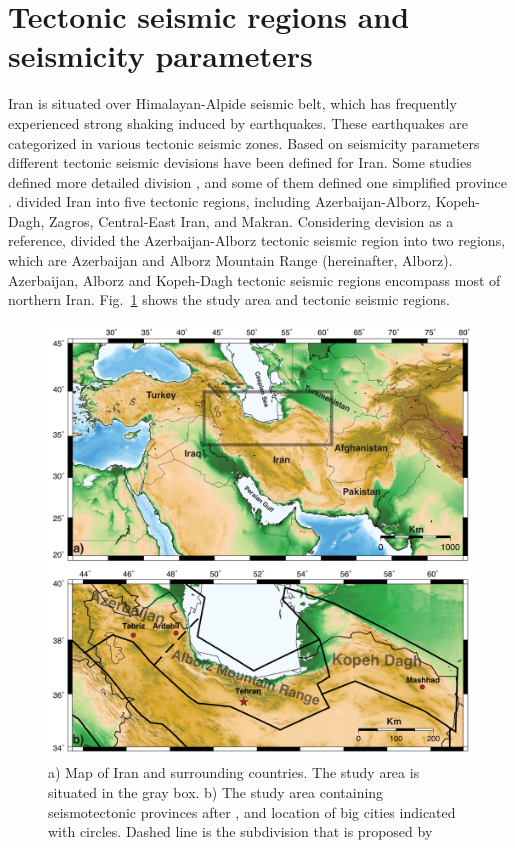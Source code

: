 
\section{Tectonic seismic regions and seismicity parameters}
\noindent
Iran is situated over Himalayan-Alpide seismic belt, which has frequently experienced strong shaking induced by earthquakes. These earthquakes are categorized in various tectonic seismic zones. Based on seismicity parameters different tectonic seismic devisions have been defined for Iran.  Some studies defined more detailed division \citep{Nowroozi1976, Tavakoli1999}, and some of them defined one simplified province \citep{Stocklin1968, Takin1972, Berberian1976}. \citet{Mirzaei1998} divided Iran into five tectonic regions, including Azerbaijan-Alborz, Kopeh-Dagh, Zagros, Central-East Iran, and Makran. Considering \citet{Mirzaei1998} devision as a reference, \citet{Karimiparidari2013} divided the Azerbaijan-Alborz tectonic seismic region into two regions, which are Azerbaijan and Alborz Mountain Range (hereinafter, Alborz). Azerbaijan, Alborz and Kopeh-Dagh tectonic seismic regions encompass most of northern Iran.  Fig.~\ref{fig:study_region} shows the study area and tectonic seismic regions. \\

\begin{figure} [ht]
\centering
\includegraphics[scale=0.6]{figures/pdf/Figure01.pdf} 
\caption{a) Map of Iran and surrounding countries. The study area is situated in the gray box. b) The study area containing seismotectonic provinces after \citet{Mirzaei1998}, and location of big cities indicated with circles. Dashed line is the subdivision that is proposed by \citet{Karimiparidari2013}}
\label{fig:study_region}
\end{figure}




